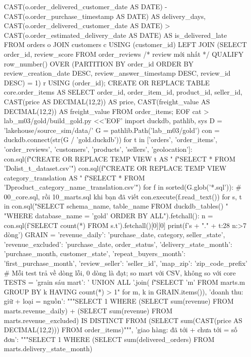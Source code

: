\begin{codeblock}
       CAST(o.order_delivered_customer_date AS DATE)
         - CAST(o.order_purchase_timestamp AS DATE) AS delivery_days,
       CAST(o.order_delivered_customer_date AS DATE)
         > CAST(o.order_estimated_delivery_date AS DATE) AS is_delivered_late
FROM orders o JOIN customers c USING (customer_id)
LEFT JOIN (SELECT order_id, review_score FROM order_reviews  /* review mới nhất */
           QUALIFY row_number() OVER (PARTITION BY order_id ORDER BY
             review_creation_date DESC, review_answer_timestamp DESC,
             review_id DESC) = 1) r USING (order_id);
CREATE OR REPLACE TABLE core.order_items AS
SELECT order_id, order_item_id, product_id, seller_id,
       CAST(price AS DECIMAL(12,2)) AS price,
       CAST(freight_value AS DECIMAL(12,2)) AS freight_value
FROM order_items;
EOF
cat > lab_m03/gold/build_gold.py <<'EOF'
import duckdb, pathlib, sys
D = 'lakehouse/source_sim/data/'
G = pathlib.Path('lab_m03/gold')
con = duckdb.connect(str(G / 'gold.duckdb'))
for t in ['orders', 'order_items', 'order_reviews', 'customers', 'products',
          'sellers', 'geolocation']:
    con.sql(f"CREATE OR REPLACE TEMP VIEW {t} AS "
            f"SELECT * FROM '{D}olist_{t}_dataset.csv'")
con.sql(f"CREATE OR REPLACE TEMP VIEW category_translation AS "
        f"SELECT * FROM '{D}product_category_name_translation.csv'")
for f in sorted(G.glob('*.sql')):  # 00_core.sql, rồi 10_marts.sql khi bạn đã viết
    con.execute(f.read_text())
for s, t in con.sql("SELECT schema_name, table_name FROM duckdb_tables() "
                    "WHERE database_name = 'gold' ORDER BY ALL").fetchall():
    n = con.sql(f'SELECT count(*) FROM {s}.{t}').fetchall()[0][0]
    print(f'{s + "." + t:28} {n:>7} dòng')
GRAIN = {'revenue_daily': 'purchase_date, category, seller_state',
         'revenue_excluded': 'purchase_date, order_status',
         'delivery_state_month': 'purchase_month, customer_state',
         'repeat_buyers_month': 'first_purchase_month',
         'review_seller': 'seller_id', 'map_zip': 'zip_code_prefix'}
# Mỗi test trả về dòng lỗi, 0 dòng là đạt; so mart với CSV, không so với core
TESTS = {
  'grain sáu mart': ' UNION ALL '.join(
      f"SELECT '{m}' FROM marts.{m} GROUP BY {k} HAVING count(*) > 1"
      for m, k in GRAIN.items()),
  'doanh thu: giữ + loại = nguồn': """SELECT 1 WHERE
     (SELECT sum(revenue) FROM marts.revenue_daily)
     + (SELECT sum(revenue) FROM marts.revenue_excluded)
     IS DISTINCT FROM (SELECT sum(CAST(price AS DECIMAL(12,2))) FROM order_items)""",
  'giao hàng: đã tới + chưa tới = số đơn': """SELECT 1 WHERE
     (SELECT sum(delivered_orders) FROM marts.delivery_state_month)
}
\end{codeblock}
